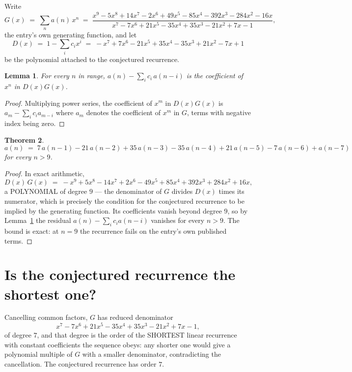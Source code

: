 \documentclass[11pt,a4paper]{article}
\theoremstyle{plain}
\newtheorem{theorem}{Theorem}
\newtheorem{lemma}[theorem]{Lemma}
\theoremstyle{definition}
\begin{document}
Write
\[
G(x)\;=\;\sum_{n}a(n)\,x^{n}\;=\;\frac{x^{9} - 5 x^{8} + 14 x^{7} - 2 x^{6} + 49 x^{5} - 85 x^{4} - 392 x^{3} - 284 x^{2} - 16 x}{x^{7} - 7 x^{6} + 21 x^{5} - 35 x^{4} + 35 x^{3} - 21 x^{2} + 7 x - 1},
\]
the entry's own generating function, and let
\[
D(x)\;=\;1-\sum_i c_i x^{i}\;=\;- x^{7} + 7 x^{6} - 21 x^{5} + 35 x^{4} - 35 x^{3} + 21 x^{2} - 7 x + 1
\]
be the polynomial attached to the conjectured recurrence.

\begin{lemma}\label{lem:key}
For every $n$ in range, $a(n)-\sum_i c_i\,a(n-i)$ is the coefficient of $x^{n}$ in
$D(x)G(x)$.
\end{lemma}

\begin{proof}
Multiplying power series, the coefficient of $x^{m}$ in $D(x)G(x)$ is
$a_m-\sum_i c_i a_{m-i}$ where $a_m$ denotes the coefficient of $x^{m}$ in $G$, terms with
negative index being zero.
\end{proof}

\begin{theorem}
\[
a(n)\;=\;7\,a(n-1) - 21\,a(n-2) + 35\,a(n-3) - 35\,a(n-4) + 21\,a(n-5) - 7\,a(n-6) + a(n-7)
\]
for every $n>9$.
\end{theorem}

\begin{proof}
In exact arithmetic,
\[
D(x)\,G(x)\;=\;- x^{9} + 5 x^{8} - 14 x^{7} + 2 x^{6} - 49 x^{5} + 85 x^{4} + 392 x^{3} + 284 x^{2} + 16 x,
\]
a POLYNOMIAL of degree $9$ --- the denominator of $G$ divides $D(x)$ times its numerator,
which is precisely the condition for the conjectured recurrence to be implied by the
generating function. Its coefficients vanish beyond degree $9$, so by
Lemma~\ref{lem:key} the residual $a(n)-\sum_ic_ia(n-i)$ vanishes for every
$n>9$. The bound is exact: at $n=9$ the recurrence fails on the entry's own published terms.
\end{proof}

\section{Is the conjectured recurrence the shortest one?}

Cancelling common factors, $G$ has reduced denominator
\[
x^{7} - 7 x^{6} + 21 x^{5} - 35 x^{4} + 35 x^{3} - 21 x^{2} + 7 x - 1,
\]
of degree $7$, and that degree is the order of the SHORTEST linear recurrence with
constant coefficients the sequence obeys: any shorter one would give a polynomial multiple of
$G$ with a smaller denominator, contradicting the cancellation. The conjectured recurrence has
order $7$.
\end{document}
